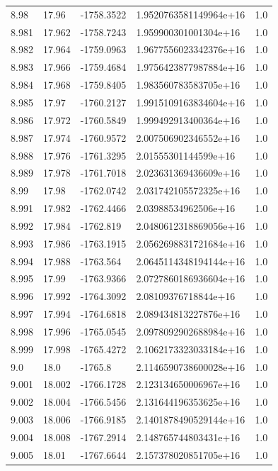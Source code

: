 \begin{tabular}{lllll}
8.98 & 17.96 & -1758.3522 & 1.9520763581149964e+16 & 1.0 \\
8.981 & 17.962 & -1758.7243 & 1.959900301001304e+16 & 1.0 \\
8.982 & 17.964 & -1759.0963 & 1.9677556023342376e+16 & 1.0 \\
8.983 & 17.966 & -1759.4684 & 1.9756423877987884e+16 & 1.0 \\
8.984 & 17.968 & -1759.8405 & 1.983560783583705e+16 & 1.0 \\
8.985 & 17.97 & -1760.2127 & 1.9915109163834604e+16 & 1.0 \\
8.986 & 17.972 & -1760.5849 & 1.999492913400364e+16 & 1.0 \\
8.987 & 17.974 & -1760.9572 & 2.007506902346552e+16 & 1.0 \\
8.988 & 17.976 & -1761.3295 & 2.01555301144599e+16 & 1.0 \\
8.989 & 17.978 & -1761.7018 & 2.023631369436609e+16 & 1.0 \\
8.99 & 17.98 & -1762.0742 & 2.031742105572325e+16 & 1.0 \\
8.991 & 17.982 & -1762.4466 & 2.03988534962506e+16 & 1.0 \\
8.992 & 17.984 & -1762.819 & 2.0480612318869056e+16 & 1.0 \\
8.993 & 17.986 & -1763.1915 & 2.0562698831721684e+16 & 1.0 \\
8.994 & 17.988 & -1763.564 & 2.0645114348194144e+16 & 1.0 \\
8.995 & 17.99 & -1763.9366 & 2.0727860186936604e+16 & 1.0 \\
8.996 & 17.992 & -1764.3092 & 2.08109376718844e+16 & 1.0 \\
8.997 & 17.994 & -1764.6818 & 2.089434813227876e+16 & 1.0 \\
8.998 & 17.996 & -1765.0545 & 2.0978092902688984e+16 & 1.0 \\
8.999 & 17.998 & -1765.4272 & 2.1062173323033184e+16 & 1.0 \\
9.0 & 18.0 & -1765.8 & 2.1146590738600028e+16 & 1.0 \\
9.001 & 18.002 & -1766.1728 & 2.123134650006967e+16 & 1.0 \\
9.002 & 18.004 & -1766.5456 & 2.131644196353625e+16 & 1.0 \\
9.003 & 18.006 & -1766.9185 & 2.1401878490529144e+16 & 1.0 \\
9.004 & 18.008 & -1767.2914 & 2.148765744803431e+16 & 1.0 \\
9.005 & 18.01 & -1767.6644 & 2.157378020851705e+16 & 1.0 \\

\end{tabular}
